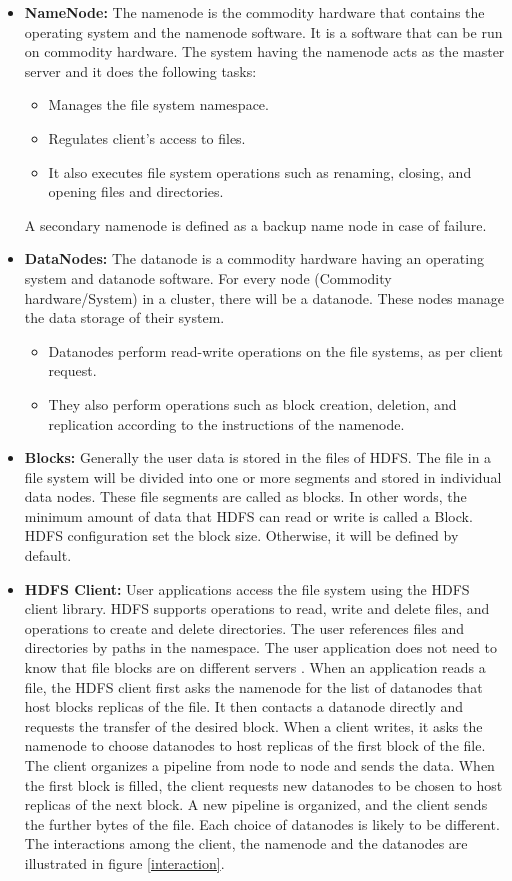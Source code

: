 \begin{itemize}
\item \textbf{NameNode:} The namenode is the commodity hardware that contains the operating system and the namenode software. It is a software that can be run on commodity hardware. The system having the namenode acts as the master server and it does the following tasks: 
\begin{itemize}
\item Manages the file system namespace.
\item Regulates client's access to files.
\item It also executes file system operations such as renaming, closing, and opening files and directories.
\end{itemize}
A secondary namenode is defined as a backup name node in case of failure.
\item \textbf{DataNodes:} The datanode is a commodity hardware having an operating system and datanode software. For every node (Commodity hardware/System) in a cluster, there will be a datanode. These nodes manage the data storage of their system. 
\begin{itemize}
\item Datanodes perform read-write operations on the file systems, as per client request.
\item They also perform operations such as block creation, deletion, and replication according to the instructions of the namenode. 
\end{itemize}

\item \textbf{Blocks:} Generally the user data is stored in the files of HDFS. The file in a file system will be divided into one or more segments and stored in individual data nodes. These file segments are called as blocks. In other words, the minimum amount of data that HDFS can read or write is called a Block. HDFS configuration set the block size. Otherwise, it will be defined by default.

\item \textbf{HDFS Client:} User applications access the file system using the HDFS client library. HDFS supports operations to read, write and delete files, and operations to create and delete directories. The user references files and directories by paths in the namespace. The user application does not need to know that file blocks are on different servers \cite{cite13}. When an application reads a file, the HDFS client first asks the namenode for the list of datanodes that host blocks replicas of the file. It then contacts a datanode directly and requests the transfer of the desired block. When a client writes, it asks the namenode to choose datanodes to host replicas of the first block of the file. The client organizes a pipeline from node to node and sends the data. When the first block is filled, the client requests new datanodes to be chosen to host replicas of the next block. A new pipeline is organized, and the client sends the further bytes of the file. Each choice of datanodes is likely to be different. The interactions among the client, the namenode and the datanodes are illustrated in figure \ref{interaction}.
\end{itemize} 


